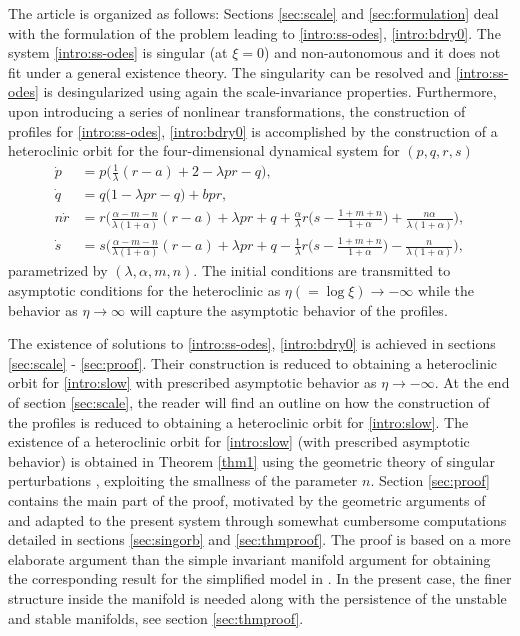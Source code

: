 \documentclass[11pt]{article}
\newcommand{\tcb}{}
\theoremstyle{remark}
\begin{document}
The article is organized as follows:
Sections \ref{sec:scale} and  \ref{sec:formulation} deal with the formulation of the problem leading to \eqref{intro:ss-odes}, \eqref{intro:bdry0}.
The system \eqref{intro:ss-odes} is singular (at $\xi=0$) and non-autonomous and it does not fit under a general existence theory.
The singularity can be resolved and \eqref{intro:ss-odes} is desingularized using again the scale-invariance properties.
Furthermore, upon introducing a series of nonlinear transformations,  the construction of profiles for \eqref{intro:ss-odes}, \eqref{intro:bdry0} is accomplished by the
construction of a heteroclinic orbit for the four-dimensional dynamical system for $(p,q,r,s)$
\begin{equation}\label{intro:slow}\tag{S}
 \begin{aligned}
 \dot{p} &=p\Big(\frac{1}{\lambda}(r-a) + 2- \lambda p r -q\Big), \\
 \dot{q} &=q\Big(1 -\lambda p r -q\Big) + b p r,\\
 n\dot{r} &=r\Big(\frac{\alpha-m-n}{\lambda(1+\alpha)}(r-a) + \lambda pr + q +\frac{\alpha}{\lambda}r\big(s- \frac{1+m+n}{1+\alpha}\big) + \frac{n\alpha}{\lambda(1+\alpha)}\Big),\\
 \dot{s} &=s\Big(\frac{\alpha-m-n}{\lambda(1+\alpha)}(r-a) + \lambda pr + q - \frac{1}{\lambda}r\big(s- \frac{1+m+n}{1+\alpha}\big) - \frac{n}{\lambda(1+\alpha)}\Big),
 \end{aligned}
\end{equation}
parametrized by $(\lambda,\alpha,m,n)$. The initial conditions are transmitted to asymptotic conditions for the heteroclinic
as $ \eta(=\log\xi) \to -\infty$ while the behavior as $\eta \to \infty$ will capture the asymptotic behavior of the profiles.


The existence of solutions to \eqref{intro:ss-odes}, \eqref{intro:bdry0} is achieved in sections \ref{sec:scale} - \ref{sec:proof}. Their construction is reduced
to obtaining a heteroclinic orbit for \eqref{intro:slow} with prescribed asymptotic behavior as $\eta \to -\infty$.
\tcb{At the end of section \ref{sec:scale}, the reader will find an outline on how the construction of the profiles is reduced to obtaining a heteroclinic orbit for \eqref{intro:slow}.}
 The existence of a heteroclinic  orbit for \eqref{intro:slow} (with prescribed asymptotic behavior) is obtained in Theorem \ref{thm1} using the geometric theory of singular perturbations \cite{fenichel_persistence_1972,fenichel_asymptotic_1974,fenichel_asymptotic_1977,fenichel_geometric_1979,Jones_1995,KUEHN_2015}, exploiting the smallness of the parameter $n$.
Section \ref{sec:proof} contains the main part of the proof, motivated by the geometric arguments of \cite{Sz1991} and adapted to the present system through somewhat cumbersome
computations detailed in sections \ref{sec:singorb} and \ref{sec:thmproof}. The proof is based on  a more elaborate argument than the simple invariant manifold argument
for obtaining the corresponding result for the simplified model in \cite{LT16}.
In the present case, the finer structure inside the manifold is needed along with the persistence of the unstable and stable manifolds, see section \ref{sec:thmproof}.
\end{document}
